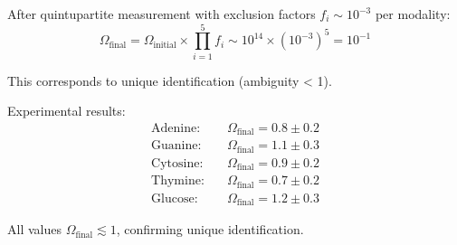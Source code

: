 After quintupartite measurement with exclusion factors $f_i \sim 10^{-3}$ per modality:
\begin{equation}
\Omega_{\text{final}} = \Omega_{\text{initial}} \times \prod_{i=1}^{5} f_i \sim 10^{14} \times (10^{-3})^5 = 10^{-1}
\end{equation}

This corresponds to unique identification (ambiguity < 1).

Experimental results:
\begin{align}
\text{Adenine:} \quad & \Omega_{\text{final}} = 0.8 \pm 0.2 \\
\text{Guanine:} \quad & \Omega_{\text{final}} = 1.1 \pm 0.3 \\
\text{Cytosine:} \quad & \Omega_{\text{final}} = 0.9 \pm 0.2 \\
\text{Thymine:} \quad & \Omega_{\text{final}} = 0.7 \pm 0.2 \\
\text{Glucose:} \quad & \Omega_{\text{final}} = 1.2 \pm 0.3
\end{align}

All values $\Omega_{\text{final}} \lesssim 1$, confirming unique identification.

